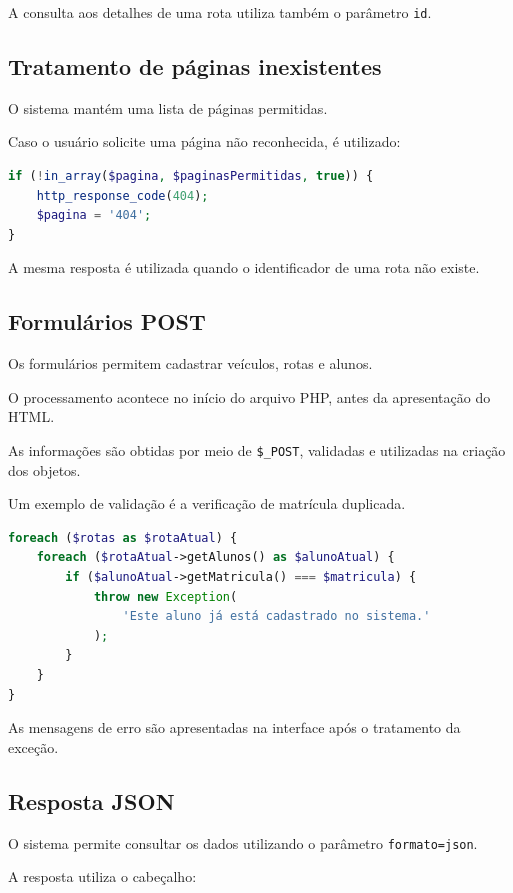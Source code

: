 \documentclass[12pt,a4paper]{article}
\begin{document}
A consulta aos detalhes de uma rota utiliza também o parâmetro \texttt{id}.

\subsection{Tratamento de páginas inexistentes}

O sistema mantém uma lista de páginas permitidas.

Caso o usuário solicite uma página não reconhecida, é utilizado:

\begin{lstlisting}[language=PHP]
if (!in_array($pagina, $paginasPermitidas, true)) {
    http_response_code(404);
    $pagina = '404';
}
\end{lstlisting}

A mesma resposta é utilizada quando o identificador de uma rota não existe.

\subsection{Formulários POST}

Os formulários permitem cadastrar veículos, rotas e alunos.

O processamento acontece no início do arquivo PHP, antes da apresentação do HTML.

As informações são obtidas por meio de \texttt{\$\_POST}, validadas e utilizadas na criação dos objetos.

Um exemplo de validação é a verificação de matrícula duplicada.

\begin{lstlisting}[language=PHP]
foreach ($rotas as $rotaAtual) {
    foreach ($rotaAtual->getAlunos() as $alunoAtual) {
        if ($alunoAtual->getMatricula() === $matricula) {
            throw new Exception(
                'Este aluno já está cadastrado no sistema.'
            );
        }
    }
}
\end{lstlisting}

As mensagens de erro são apresentadas na interface após o tratamento da exceção.

\subsection{Resposta JSON}

O sistema permite consultar os dados utilizando o parâmetro \texttt{formato=json}.

A resposta utiliza o cabeçalho:
\end{document}
